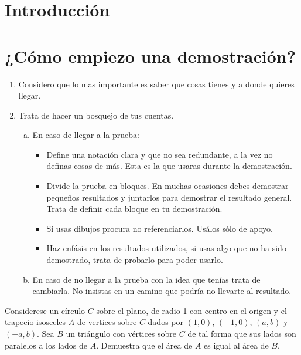 \documentclass[a4paper,openright,10pt]{book}
\numberwithin{equation}{section}
\theoremstyle{definition}
\theoremstyle{definition}
\begin{document}
\tableofcontents %
\chapter*{Introducción}\label{cap.introduccion}

\chapter*{¿Cómo empiezo una demostración?}

\begin{itemize}
\begin{enumerate}

Al iniciar 
\item Considero que lo mas importante es saber que cosas tienes y a donde quieres llegar. 
\item Trata de hacer un bosquejo de tus cuentas.

\begin{enumerate}[a)]
\item En caso de llegar a la prueba:

\begin{itemize}
\item  Define una notación clara y que no sea redundante, a la vez no definas cosas de más. Esta es la que usaras durante la demostración.   

\item Divide la prueba en bloques. En muchas ocasiones debes demostrar pequeños resultados y juntarlos para demostrar el resultado general. Trata de definir cada bloque en tu demostración.

\item Si usas dibujos procura no referenciarlos. Usálos sólo de apoyo.  

\item Haz enfásis en los resultados utilizados, si usas algo que no ha sido demostrado, trata de probarlo para poder usarlo.
\end{itemize}

\item En caso de no llegar a la prueba con la idea que tenías trata de cambiarla. No insistas en un camino que podría no llevarte al resultado.
\end{enumerate}

\end{enumerate}
\begin{ejm}
Considerese un círculo $C$ sobre el plano, de radio 1 con centro en el origen y el trapecio isosceles $A$ de vertices sobre $C$ dados por $(1,0)$, $(-1,0)$, $(a,b)$ y $(-a,b)$. Sea $B$ un triángulo con vértices sobre $C$ de tal forma que sus lados son paralelos a los lados de $A$. Demuestra que el área de $A$ es igual al área de $B.$


\end{ejm}
\end{itemize}
\end{document}
